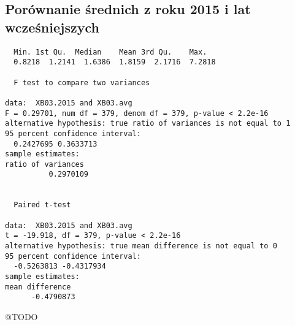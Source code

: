 \newpage
\subsection*{Porównanie średnich z roku 2015 i lat wcześniejszych}

\begin{verbatim}
  Min. 1st Qu.  Median    Mean 3rd Qu.    Max. 
  0.8218  1.2141  1.6386  1.8159  2.1716  7.2818 

  F test to compare two variances

data:  XB03.2015 and XB03.avg
F = 0.29701, num df = 379, denom df = 379, p-value < 2.2e-16
alternative hypothesis: true ratio of variances is not equal to 1
95 percent confidence interval:
  0.2427695 0.3633713
sample estimates:
ratio of variances 
          0.2970109 


  Paired t-test

data:  XB03.2015 and XB03.avg
t = -19.918, df = 379, p-value < 2.2e-16
alternative hypothesis: true mean difference is not equal to 0
95 percent confidence interval:
  -0.5263813 -0.4317934
sample estimates:
mean difference 
      -0.4790873 

\end{verbatim}

@TODO




